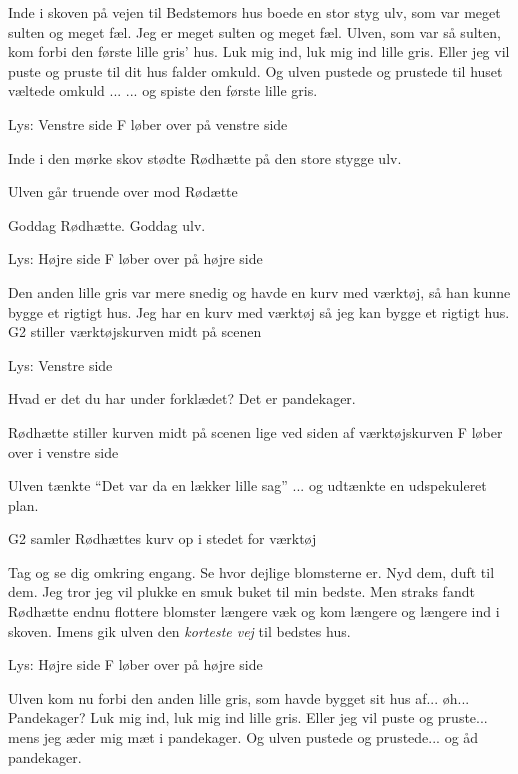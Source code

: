 \documentclass[a4paper,11pt]{article}
\begin{document}
\begin{sketch}
 Inde i skoven på vejen til Bedstemors hus boede en stor styg ulv, som var meget sulten og meget fæl.
 Jeg er meget sulten og meget fæl.
 Ulven, som var så sulten, kom forbi den første lille gris' hus.
 Luk mig ind, luk mig ind lille gris. Eller jeg vil puste og pruste til dit hus falder omkuld.
 Og ulven pustede og prustede til huset væltede omkuld ...
 ... og spiste den første lille gris.

\scene Lys: Venstre side
\scene F løber over på venstre side

 Inde i den mørke skov stødte Rødhætte på den store stygge ulv.

\scene Ulven går truende over mod Rødætte

 Goddag Rødhætte.
 Goddag ulv.

\scene Lys: Højre side
\scene F løber over på højre side

 Den anden lille gris var mere snedig og havde en kurv med værktøj, så han kunne bygge et rigtigt hus.
 Jeg har en kurv med værktøj så jeg kan bygge et rigtigt hus.
\scene G2 stiller værktøjskurven midt på scenen

\scene Lys: Venstre side

 Hvad er det du har under forklædet?
 Det er pandekager.

\scene Rødhætte stiller kurven midt på scenen lige ved siden af værktøjskurven
\scene F løber over i venstre side

 Ulven tænkte
 ``Det var da en lækker lille sag''
 ... og udtænkte en udspekuleret plan.

\scene G2 samler Rødhættes kurv op i stedet for værktøj

 Tag og se dig omkring engang. Se hvor dejlige blomsterne er. Nyd dem, duft til dem.
 Jeg tror jeg vil plukke en smuk buket til min bedste.
 Men straks fandt Rødhætte endnu flottere blomster længere væk og kom længere og længere ind i skoven.
 Imens gik ulven den \emph{korteste vej} til bedstes hus.

\scene Lys: Højre side
\scene F løber over på højre side

 Ulven kom nu forbi den anden lille gris, som havde bygget sit hus af... øh... Pandekager?
 Luk mig ind, luk mig ind lille gris. Eller jeg vil puste og pruste... mens jeg æder mig mæt i pandekager.
 Og ulven pustede og prustede... og åd pandekager.


\end{sketch}
\end{document}
